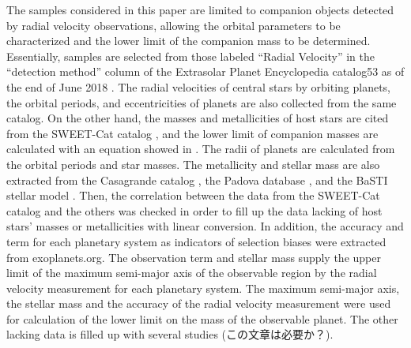 \documentclass[twocolumn, dvipdfmx]{aastex62}
\begin{document}
\begin{CJK*}{UTF8}{min}
The samples considered in this paper are limited to companion objects detected by radial velocity observations, allowing the orbital parameters to be characterized and the lower limit of the companion mass to be determined. Essentially, samples are selected from those labeled “Radial Velocity” in the “detection method” column of the Extrasolar Planet Encyclopedia catalog53 as of the end of June 2018 \citep{2011A&A...532A..79S}. The radial velocities of central stars by orbiting planets, the orbital periods, and eccentricities of planets are also collected from the same catalog. On the other hand, the masses and metallicities of host stars are cited from the SWEET-Cat catalog \citep{2018A&A...620A..58S}, and the lower limit of companion masses are calculated with an equation showed in \cite{2008ApJ...677.1324T}. The radii of planets are calculated from the orbital periods and star masses. The metallicity and stellar mass are also extracted from the Casagrande catalog \citep{2011A&A...530A.138C}, the Padova database \citep{2000A&AS..141..371G}, and the BaSTI stellar model \citep{2018ApJ...856..125H}. Then, the correlation between the data from the SWEET-Cat catalog and the others was checked in order to fill up the data lacking of host stars' masses or metallicities with linear conversion. In addition, the accuracy and term for each planetary system as indicators of selection biases were extracted from exoplanets.org. The observation term and stellar mass supply the upper limit of the maximum semi-major axis of the observable region by the radial velocity measurement for each planetary system. The maximum semi-major axis, the stellar mass and the accuracy of the radial velocity measurement were used for calculation of the lower limit on the mass of the observable planet. The other lacking data is filled up with several studies (この文章は必要か？).


\end{CJK*}
\end{document}
